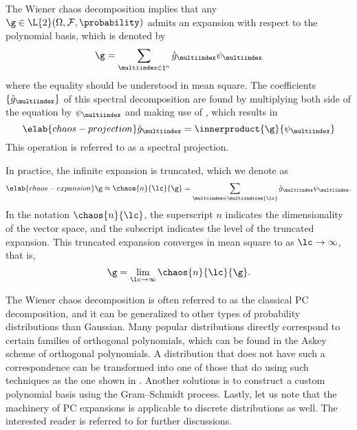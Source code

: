 The Wiener chaos decomposition implies that any $\g \in \L{2}(\Omega,
\mathcal{F}, \probability)$ admits an expansion with respect to the polynomial
basis, which is denoted by
\[
  \g = \sum_{\multiindex \in \natural^n} \hat{g}_{\multiindex} \psi_{\multiindex}
\]
where the equality should be understood in mean square. The coefficients $\{
\hat{g}_{\multiindex} \}$ of this spectral decomposition are found by
multiplying both side of the equation by $\psi_{\multiindex}$ and making use of
, which results in
\begin{equation} \elab{chaos-projection}
  \hat{g}_{\multiindex} = \innerproduct{\g}{\psi_{\multiindex}}
\end{equation}
This operation is referred to as a spectral projection.

In practice, the infinite expansion is truncated, which we denote as
\begin{equation} \elab{chaos-expansion}
  \g \approx \chaos{n}{\lc}{\g} = \sum_{\multiindex \in \multiindices{\lc}} \hat{g}_{\multiindex} \psi_{\multiindex}.
\end{equation}
In the notation $\chaos{n}{\lc}$, the superscript $n$ indicates the
dimensionality of the vector space, and the subscript \lc indicates the level of
the truncated expansion. This truncated expansion converges in mean square to \g
as $\lc \to \infty$, that is,
\[
  \g = \lim_{\lc \to \infty} \chaos{n}{\lc}{\g}.
\]

The Wiener chaos decomposition is often referred to as the classical \acf{PC}
decomposition, and it can be generalized to other types of probability
distributions than Gaussian. Many popular distributions directly correspond to
certain families of orthogonal polynomials, which can be found in the Askey
scheme of orthogonal polynomials. A distribution that does not have such a
correspondence can be transformed into one of those that do using such
techniques as the one shown in . Another
solutions is to construct a custom polynomial basis using the Gram--Schmidt
process. Lastly, let us note that the machinery of \ac{PC} expansions is
applicable to discrete distributions as well. The interested reader is referred
to \cite{xiu2010} for further discussions.
